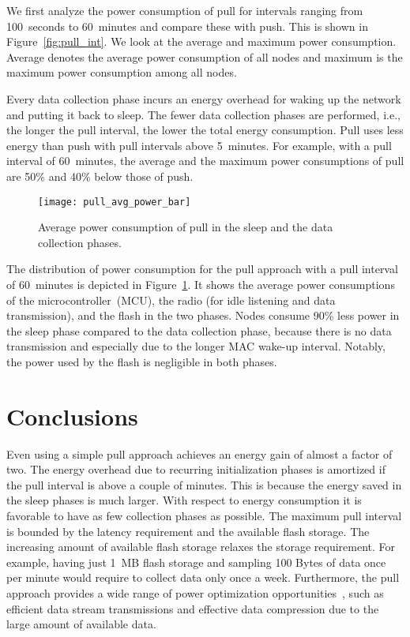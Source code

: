 \documentclass[10pt]{sensys-abstract}
\begin{document}
We first analyze the power consumption of pull for intervals  ranging from 100~seconds to 60~minutes and compare these with push. This is shown in Figure~\ref{fig:pull_int}. We look at the average and maximum power consumption. Average denotes the average power consumption of all nodes and maximum is the maximum power consumption among all nodes.

Every data collection phase incurs an energy overhead for waking up the network and putting it back to sleep. The fewer data collection phases are performed, i.e., the longer the pull interval, the lower the total energy consumption. 
Pull uses less energy than push with pull intervals above 5~minutes. For example, with a pull interval of 60~minutes, the average and the maximum power consumptions of pull are 50\% and 40\% below those of push.

\begin{figure}
 \centering
 \texttt{[image: pull\_avg\_power\_bar]}
 \caption{Average power consumption of pull in the sleep and the data collection phases.}
 \label{fig:pull_power_bar}
\end{figure}

The distribution of power consumption for the pull approach with a pull interval of 60~minutes is depicted in Figure~\ref{fig:pull_power_bar}. It shows the average power consumptions of the microcontroller~(MCU), the radio (for idle listening and data transmission), and the flash in the two phases. Nodes consume 90\% less power in the sleep phase compared to the data collection phase, because there is no data transmission and especially due to the longer MAC wake-up interval. Notably, the power used by the flash is negligible in both phases.

\section{Conclusions}

Even using a simple pull approach achieves an energy gain of almost a factor of two. The energy overhead due to recurring initialization phases is amortized if the pull interval is above a couple of minutes. This is because the energy saved in the sleep phases is much larger. With respect to energy consumption it is favorable to have as few collection phases as possible. The maximum pull interval is bounded by the latency requirement and the available flash storage. The increasing amount of available flash storage relaxes the storage requirement. For example, having just 1~MB flash storage and sampling 100 Bytes of data once per minute would require to collect data only once a week. Furthermore, the pull approach provides a wide range of power optimization opportunities~\cite{Dutta2007}, such as efficient data stream transmissions and effective data compression due to the large amount of available data.
\end{document}
